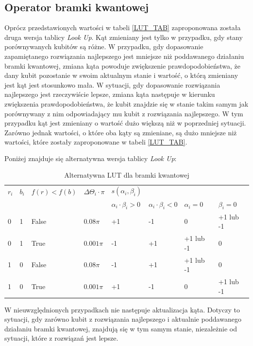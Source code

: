\subsection{Operator bramki kwantowej}
Oprócz przedstawionych wartości w tabeli \ref{LUT_TAB} zaproponowana została druga wersja tablicy \textit{Look Up}. Kąt zmieniany jest tylko w przypadku, gdy stany porównywanych kubitów są różne. W przypadku, gdy dopasowanie zapamiętanego rozwiązania najlepszego jest mniejsze niż poddawanego działaniu bramki kwantowej, zmiana kąta powoduje zwiększenie prawdopodobieństwa, że dany kubit pozostanie w swoim aktualnym stanie i wartość, o którą zmieniany jest kąt jest stosunkowo mała. W sytuacji, gdy dopasowanie rozwiązania najlepszego jest rzeczywiście lepsze, zmiana kąta następuje w kierunku zwiększenia prawdopodobieństwa, że kubit znajdzie się w stanie takim samym jak porównywany z nim odpowiadający mu kubit z rozwiązania najlepszego. W tym przypadku kąt jest zmieniany o wartość dużo większą niż w poprzedniej sytuacji. Zarówno jednak wartości, o które oba kąty są zmieniane, są dużo mniejsze niż wartości, które zostały zaproponowane w tabeli \ref{LUT_TAB}.

Poniżej znajduje się alternatywna wersja tablicy \textit{Look Up}:
\begin{table}[h]
\label{LUT_TAB_MOD}
\begin{tabular}{l l l l l l l l}
\hline
$r_i$ & $b_i$ & $f(r)<f(b)$ & $\Delta\Theta_i \cdot \pi$ & $s(\alpha_i,\beta_i)$ & & & \\
\cline{5-8} 
& & & & $\alpha_i \cdot \beta_i > 0$ & $\alpha_i \cdot \beta_i < 0$ & $\alpha_i = 0$ & $\beta_i = 0$ \\
\hline
0 & 1 & False & $0.08\pi$  & +1 & -1 & 0         & +1 lub -1\\
0 & 1 & True  & $0.001\pi$ & -1 & +1 & +1 lub -1 & 0\\
1 & 0 & False & $0.08\pi$  & -1 & +1 & +1 lub -1 & 0\\
1 & 0 & True  & $0.001\pi$ & +1 & -1 & 0         & +1 lub -1\\
\hline
\end{tabular}
\caption{Alternatywna LUT dla bramki kwantowej}
\end{table} 

W nieuwzględnionych przypadkach nie następuje aktualizacja kąta. Dotyczy to sytuacji, gdy zarówno kubit z rozwiązania najlepszego i aktualnie poddawanego działaniu bramki kwantowej, znajdują się w tym samym stanie, niezależnie od sytuacji, które z rozwiązań jest lepsze.

